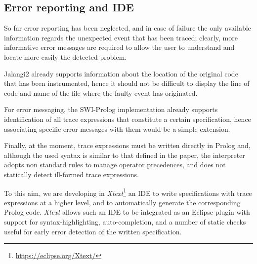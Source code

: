 



\subsection{Error reporting and IDE}
So far error reporting has been neglected, and in case of failure the only available information
regards the unexpected event that has been traced; clearly, more informative error messages
are required to allow the user to understand and locate more easily the detected problem.

Jalangi2 already supports information about the location of the original code that has been
instrumented, hence it should not be difficult to display the line of code and name of the file where
the faulty event has originated.

For error messaging, the SWI-Prolog implementation already supports identification of
all trace expressions that constitute a certain specification, hence associating specific error messages with them
would be a simple extension.

Finally, at the moment, trace expressions must be written directly in Prolog and, although the used syntax
is similar to that defined in the paper, the interpreter adopts non standard rules to manage operator precedences,
and does not statically detect ill-formed trace expressions.

To this aim, we are developing in \textit{Xtext}\footnote{\url{https://eclipse.org/Xtext/}} an IDE
to write specifications with trace expressions at a higher level, and to automatically generate
the corresponding Prolog code. \textit{Xtext} allows such an IDE to be integrated as an Eclipse plugin
with support for syntax-highlighting, auto-completion,
and a number of static checks useful for early error detection of the written specification.
